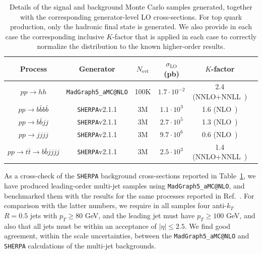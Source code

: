  


\begin{table}[h]
  \small
\begin{center}
\begin{tabular}{|c|c|c|c|c|c|}
\hline
Process &  Generator & $N_{\mathrm{evt}}$ & $\sigma_{\mathrm{LO}}$ (pb)  & $K$-factor \\
\hline
\hline
$pp \to hh$ &  {\tt MadGraph5\_aMC@NLO} & 100K & $1.7\cdot10^{-2}$  &  2.4  (NNLO+NNLL~\cite{deFlorian:2013jea,deFlorian:2015moa}) \\
\hline
\hline
$pp \to b\bar{b}b\bar{b}$ &  {\tt SHERPA}v2.1.1 & 3M &$1.1 \cdot10^3$  & 1.6 (NLO~\cite{Alwall:2014hca}) \\
$pp \to b\bar{b}jj$ &  {\tt SHERPA}v2.1.1 & 3M & $2.7 \cdot 10^5$ & 1.3 (NLO~\cite{Alwall:2014hca}) \\
$pp \to jjjj$ &  {\tt SHERPA}v2.1.1 & 3M  & $9.7\cdot 10^6$ &  0.6 (NLO~\cite{Bern:2011ep})\\
$pp \to t\bar{t}\to b\bar{b}jjjj$ &  {\tt SHERPA}v2.1.1 & 3M & $2.5\cdot 10^3$   & 1.4 (NNLO+NNLL~\cite{Czakon:2013goa})\\
\hline
\end{tabular}
\caption{\small Details of the signal and background Monte
  Carlo samples generated,
  together with the corresponding generator-level LO cross-sections.
  For top quark production, only the hadronic final state is generated.
We also provide in each case the corresponding inclusive $K$-factor
  that is applied in each case to correctly normalize the distribution to the known
  higher-order results. \label{tab:samples}
} 
\end{center}
\end{table}%

As a cross-check of the {\tt SHERPA}
background cross-sections reported in Table~\ref{tab:samples}, we have produced leading-order
multi-jet samples
using {\tt MadGraph5\_aMC@NLO}, and
benchmarked them with the results for the same processes reported in
Ref.~\cite{Alwall:2014hca}.
%
For comparison with the latter numbers, 
we require in all samples four anti-$k_T$ $R=0.5$ jets with $p_T \ge 80 $ GeV, and the leading jet must have $p_T \ge 100$ GeV, and
also that all jets must be within an acceptance of $|\eta| \le 2.5 $.
%
We find good agreement, within the scale uncertainties, between the {\tt MadGraph5\_aMC@NLO} and {\tt SHERPA} calculations of the multi-jet
backgrounds.


